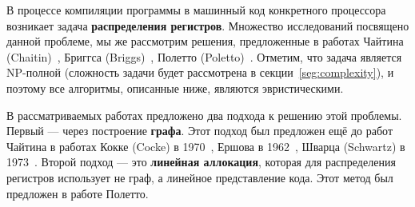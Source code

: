 В процессе компиляции программы в машинный код конкретного процессора возникает задача \textbf{распределения регистров}. %
Множество исследований посвящено данной проблеме, мы же рассмотрим решения,
предложенные в работах Чайтина (Chaitin)~\cite{chaitin1982}, Бриггса (Briggs)~\cite{briggs1994},
Полетто (Poletto)~\cite{poletto1999}. %
Отметим, что задача является NP-полной (сложность задачи будет рассмотрена в секции~\ref{seg:complexity}),
и поэтому все алгоритмы, описанные ниже, являются эвристическими.

В рассматриваемых работах предложено два подхода к решению этой проблемы. 
Первый — через построение \textbf{графа}.
Этот подход был предложен ещё до работ Чайтина в работах Кокке (Cocke) в 1970~\cite{cocke1970},
Ершова в 1962~\cite{ershov1962}, Шварца (Schwartz) в 1973~\cite{schwartz1973}. %
Второй подход — это \textbf{линейная аллокация},
которая для распределения регистров использует не граф, а линейное представление кода.
Этот метод был предложен в работе Полетто.

